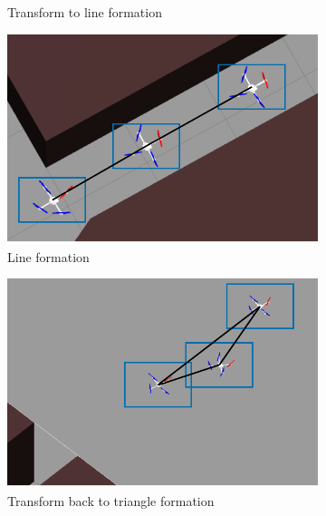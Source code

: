 \begin{figure}
\begin{subfigure}[b]{0.48\textwidth}
    \caption{Transform to line formation}
    \label{fig:1gazebo_3}
    \end{subfigure}
    \begin{subfigure}[b]{0.48\textwidth}
    \includegraphics[width=\textwidth]{paper2/images/gazebo_res4.pdf}
    \caption{Line formation}
    \label{fig:1gazebo_4}
    \end{subfigure}
    \begin{subfigure}[b]{0.48\textwidth}
    \includegraphics[width=\textwidth]{paper2/images/gazebo_res5.pdf}
    \caption{Transform back to triangle formation}
    \label{fig:1gazebo_5}
    \end{subfigure}
    \begin{subfigure}[b]{0.48\textwidth}

\end{subfigure}
\end{figure}
